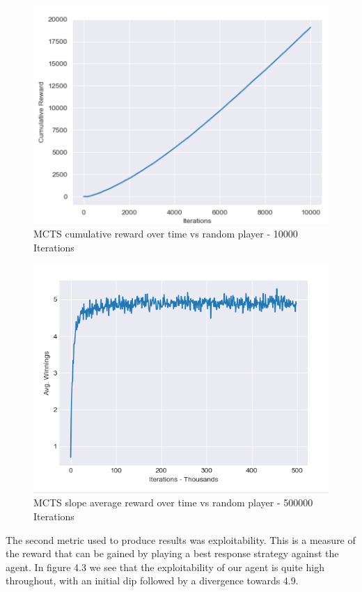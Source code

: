 \begin{figure}[ht]
    \includegraphics[scale=.8]{images/cumulative_reward_mcts_vs_random.png}
    \caption{MCTS cumulative reward over time vs random player - 10000 Iterations}
\end{figure}

\begin{figure}[ht]
    \includegraphics[scale=.7]{images/avg_reward_500000__20_random.png}
    \caption{MCTS slope average reward over time vs random player - 500000 Iterations}
\end{figure}

The second metric used to produce results was exploitability.
This is a measure of the reward that can be gained by playing a best response strategy
against the agent.
In figure 4.3 we see that the exploitability of our agent is quite high throughout, with an
initial dip followed by a divergence towards 4.9.

